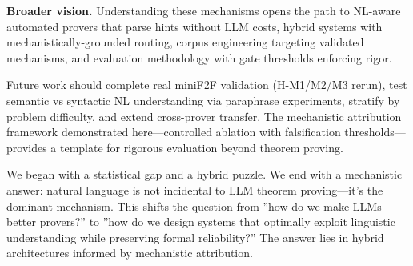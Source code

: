 \textbf{Broader vision.} Understanding these mechanisms opens the path to NL-aware automated provers that parse hints without LLM costs, hybrid systems with mechanistically-grounded routing, corpus engineering targeting validated mechanisms, and evaluation methodology with gate thresholds enforcing rigor.

Future work should complete real miniF2F validation (H-M1/M2/M3 rerun), test semantic vs syntactic NL understanding via paraphrase experiments, stratify by problem difficulty, and extend cross-prover transfer. The mechanistic attribution framework demonstrated here---controlled ablation with falsification thresholds---provides a template for rigorous evaluation beyond theorem proving.

We began with a statistical gap and a hybrid puzzle. We end with a mechanistic answer: natural language is not incidental to LLM theorem proving---it's the dominant mechanism. This shifts the question from ''how do we make LLMs better provers?'' to ''how do we design systems that optimally exploit linguistic understanding while preserving formal reliability?'' The answer lies in hybrid architectures informed by mechanistic attribution.
